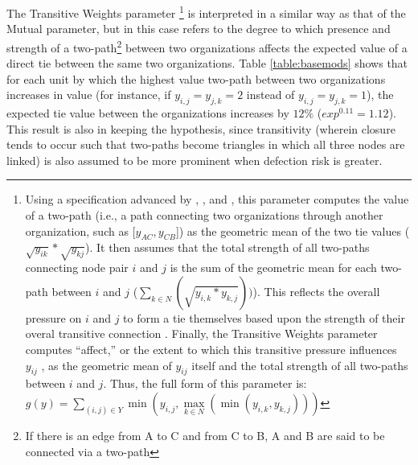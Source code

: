 \documentclass[12pt,a4paper,titlepage]{article}
\begin{document}
The Transitive Weights parameter \footnote{Using a specification advanced by \parencite{handcock2014}, \parencite{wyatt2009}, and \parencite{krivitsky2012}, this parameter computes the value of a two-path (i.e., a path connecting two organizations through another organization, such as [$y_{AC},y_{CB}$]) as the geometric mean of the two tie values ($\sqrt{y_{ik}}*\sqrt{y_{kj}}$). It then assumes that the total strength of all two-paths connecting node pair $i$ and $j$ is the sum of the geometric mean for each two-path between $i$ and $j$ ($\sum \limits_{k \in N}(\sqrt{y_{i,k}*y_{k,j}}))$). This reflects the overall pressure on $i$ and $j$ to form a tie themselves based upon the strength of their overal transitive connection \parencite{krivitsky2012}. Finally, the Transitive Weights parameter computes ``affect,'' or the extent to which this transitive pressure influences $y_{ij}$ \parencite{krivitsky2012}, as the geometric mean of $y_{ij}$ itself and the total strength of all two-paths between $i$ and $j$. Thus, the full form of this parameter is: $g(y) = \sum_{(i,j) \in Y} \min(y_{i,j},\max\limits_{k \in N}(\min(y_{i,k},y_{k,j})))$} is interpreted in a similar way as that of the Mutual parameter, but in this case refers to the degree to which presence and strength of a two-path\footnote{If there is an edge from A to C and from C to B, A and B are said to be connected via a two-path} between two organizations affects the expected value of a direct tie between the same two organizations. Table \ref{table:basemods} shows that for each unit by which the highest value two-path between two organizations increases in value (for instance, if $y_{i,j} = y_{j,k} = 2$ instead of $y_{i,j} = y_{j,k} = 1$), the expected tie value between the organizations increases by $12\%$ ($exp^{0.11} = 1.12$). This result is also in keeping the \textcite{berardo2010} hypothesis, since transitivity (wherein closure tends to occur such that two-paths become triangles in which all three nodes are linked) is also assumed to be more prominent when defection risk is greater. 
\end{document}
